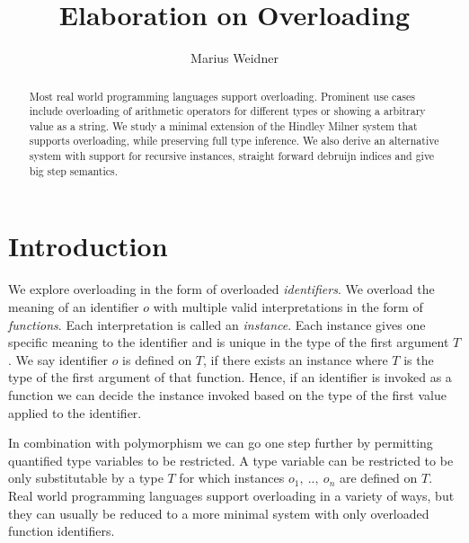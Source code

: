 \documentclass[runningheads]{llncs}
\begin{document}
\title{Elaboration on Overloading}
\author{Marius Weidner}
\maketitle

\begin{abstract}
Most real world programming languages support overloading. 
Prominent use cases include overloading of arithmetic operators for different types or showing a arbitrary value as a string. 
We study a minimal extension of the Hindley Milner system that supports overloading, while preserving full type inference. 
We also derive an alternative system with support for recursive instances, straight forward debruijn indices and give big step semantics.
\end{abstract}

\section{Introduction}
We explore overloading in the form of overloaded \emph{identifiers}.
We overload the meaning of an identifier $o$ with multiple valid interpretations in the form of \emph{functions}. 
Each interpretation is called an \emph{instance}.
Each instance gives one specific meaning to the identifier and is unique in the type of the first argument $T$. 
We say identifier $o$ is defined on $T$, if there exists an instance where $T$ is the type of the first argument of that function.
Hence, if an identifier is invoked as a function we can decide the instance invoked based on the type of the first value applied to the identifier. 

In combination with polymorphism we can go one step further by permitting quantified type variables to be restricted. 
A type variable can be restricted to be only substitutable by a type $T$ for which instances $o_1, \ .., \ o_n$ are defined on $T$.
Real world programming languages support overloading in a variety of ways, but they can usually be reduced to a more minimal system with only overloaded function identifiers. 
\end{document}
